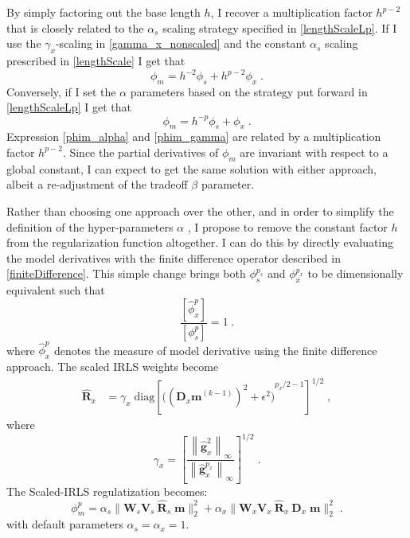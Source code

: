 By simply factoring out the base length $h$, I recover a multiplication factor $h^{p-2}$ that is closely related to the $\alpha_s$ scaling strategy specified in \eqref{lengthScaleLp}. 
If I use the $\gamma_x$-scaling in \eqref{gamma_x_nonscaled} and the constant $\alpha_s$ scaling prescribed in \eqref{lengthScale} I get that
\begin{equation}\label{phim_gamma}
\phi_m = h^{-2} \phi_s + h^{p-2} \phi_x \;.
\end{equation} 
Conversely, if I set the $\alpha$ parameters based on the strategy put forward in \eqref{lengthScaleLp} I get that
\begin{equation}\label{phim_alpha}
\phi_m = h^{-p} \phi_s + \phi_x \;.
\end{equation} 
Expression \eqref{phim_alpha} and \eqref{phim_gamma} are related by a multiplication factor $h^{p-2}$.
Since the partial derivatives of $\phi_m$ are invariant with respect to a global constant, I can expect to get the same solution with either approach, albeit a re-adjustment of the tradeoff $\beta$ parameter. 

Rather than choosing one approach over the other, and in order to simplify the definition of the hyper-parameters $\alpha$ , I propose to remove the constant factor $h$ from the regularization function altogether. I can do this by directly evaluating the model derivatives with the finite difference operator described in \eqref{finiteDifference}.
This simple change brings both $\phi_s^{p_s}$ and $\phi_x^{p_x}$ to be dimensionally equivalent such that 
\begin{equation}
\frac{[\hat \phi_x^p] }{ [\phi_s^p]} = 1\;.
\end{equation} 
where $\hat \phi_x^p$ denotes the measure of model derivative using the finite difference approach.
The scaled IRLS weights become
\begin{equation}\label{etaScale}
\begin{split}
\mathbf{\hat R}_x &= \gamma_x\; \text{diag} \left[{\Big( {({\mathbf{D}_x \mathbf{m}}^{(k-1)})}^{2} + \epsilon^2 \Big)}^{p_x/2 - 1} \right]^{1/2} \;,
\end{split}
\end{equation}
where
\begin{equation}\label{gammaScale}
\gamma_x = \left[ \frac{ \left\|\mathbf{\hat g}_x^2\right\|_\infty}{\left\|\mathbf{\hat g}_x^{p_x}\right\|_\infty}\right]^{1/2}\;.
\end{equation}
The Scaled-IRLS regulatization becomes:
\begin{equation}\label{IRLSobjFunScaled}
\phi_m^p =\alpha_s \|\mathbf{W}_s \mathbf{V}_s\:\mathbf{\hat R}_s\;\mathbf{m}\|_2^2 + \alpha_x\|\mathbf{W}_x\mathbf{V}_x\:\mathbf{\hat R}_x\:\mathbf{D}_x\;\mathbf{m}\|_2^2 \;.
\end{equation}
with default parameters $\alpha_s=\alpha_x=1$.

